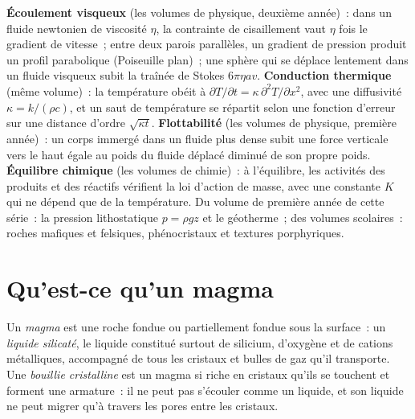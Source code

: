 \begin{recall}
\textbf{Écoulement visqueux} (les volumes de physique, deuxième année)~: dans un fluide newtonien
de viscosité $\eta$, la contrainte de cisaillement vaut $\eta$ fois le gradient de vitesse~; entre
deux parois parallèles, un gradient de pression produit un profil parabolique (Poiseuille plan)~;
une sphère qui se déplace lentement dans un fluide visqueux subit la traînée de Stokes
$6\pi\eta a v$. \textbf{Conduction thermique} (même volume)~: la température obéit à
$\partial T/\partial t = \kappa\,\partial^2T/\partial x^2$, avec une diffusivité $\kappa = k/(\rho
c)$, et un saut de température se répartit selon une fonction d'erreur sur une distance d'ordre
$\sqrt{\kappa t}$. \textbf{Flottabilité} (les volumes de physique, première année)~: un corps
immergé dans un fluide plus dense subit une force verticale vers le haut égale au poids du fluide
déplacé diminué de son propre poids. \textbf{Équilibre chimique} (les volumes de chimie)~: à
l'équilibre, les activités des produits et des réactifs vérifient la loi d'action de masse, avec une
constante $K$ qui ne dépend que de la température. Du volume de première année de cette série~: la pression
lithostatique $p = \rho g z$ et le géotherme~; des volumes scolaires~: roches mafiques et felsiques, phénocristaux
et textures porphyriques.
\end{recall}

\section{Qu'est-ce qu'un magma}

\begin{definition}[Magma]\label{def:b2:magma-emplacement:magma}
Un \emph{magma} est une roche fondue ou partiellement fondue sous la surface~: un
\emph{liquide silicaté}, le liquide constitué surtout de silicium,
d'oxygène et de cations métalliques, accompagné de tous les cristaux et bulles de gaz qu'il transporte.
Une \emph{bouillie cristalline} est un magma si riche en cristaux qu'ils
se touchent et forment une armature~: il ne peut pas s'écouler comme un liquide, et son liquide ne peut
migrer qu'à travers les pores entre les cristaux.
\end{definition}

